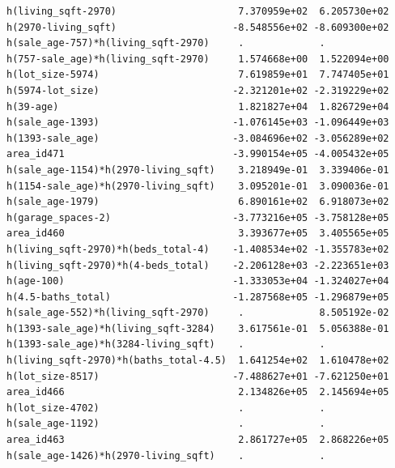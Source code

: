 \documentclass[
]{article}
\begin{document}
\begin{verbatim}
h(living_sqft-2970)                     7.370959e+02  6.205730e+02
h(2970-living_sqft)                    -8.548556e+02 -8.609300e+02
h(sale_age-757)*h(living_sqft-2970)     .             .           
h(757-sale_age)*h(living_sqft-2970)     1.574668e+00  1.522094e+00
h(lot_size-5974)                        7.619859e+01  7.747405e+01
h(5974-lot_size)                       -2.321201e+02 -2.319229e+02
h(39-age)                               1.821827e+04  1.826729e+04
h(sale_age-1393)                       -1.076145e+03 -1.096449e+03
h(1393-sale_age)                       -3.084696e+02 -3.056289e+02
area_id471                             -3.990154e+05 -4.005432e+05
h(sale_age-1154)*h(2970-living_sqft)    3.218949e-01  3.339406e-01
h(1154-sale_age)*h(2970-living_sqft)    3.095201e-01  3.090036e-01
h(sale_age-1979)                        6.890161e+02  6.918073e+02
h(garage_spaces-2)                     -3.773216e+05 -3.758128e+05
area_id460                              3.393677e+05  3.405565e+05
h(living_sqft-2970)*h(beds_total-4)    -1.408534e+02 -1.355783e+02
h(living_sqft-2970)*h(4-beds_total)    -2.206128e+03 -2.223651e+03
h(age-100)                             -1.333053e+04 -1.324027e+04
h(4.5-baths_total)                     -1.287568e+05 -1.296879e+05
h(sale_age-552)*h(living_sqft-2970)     .             8.505192e-02
h(1393-sale_age)*h(living_sqft-3284)    3.617561e-01  5.056388e-01
h(1393-sale_age)*h(3284-living_sqft)    .             .           
h(living_sqft-2970)*h(baths_total-4.5)  1.641254e+02  1.610478e+02
h(lot_size-8517)                       -7.488627e+01 -7.621250e+01
area_id466                              2.134826e+05  2.145694e+05
h(lot_size-4702)                        .             .           
h(sale_age-1192)                        .             .           
area_id463                              2.861727e+05  2.868226e+05
h(sale_age-1426)*h(2970-living_sqft)    .             .           
                                                                  

\end{verbatim}
\end{document}
